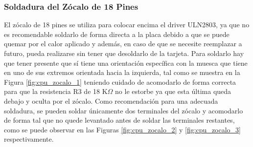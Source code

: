 \documentclass{article}
\begin{document}
\subsubsection{Soldadura del Zócalo de 18 Pines}
El zócalo de 18 pines se utiliza para colocar encima el driver ULN2803, ya que no es recomendable soldarlo de forma directa a la placa debido a que se puede quemar por el calor aplicado y además, en caso de que se necesite reemplazar a futuro, pueda realizarse sin tener que desoldarlo de la tarjeta. Para soldarlo hay que tener presente que sí tiene una orientación específica con la muesca que tiene en uno de sus extremos orientada hacia la izquierda, tal como se muestra en la Figura \ref{fig:cpu_zocalo_1} teniendo cuidado de acomodarlo de forma correcta para que la resistencia R3 de 18 K$\Omega$ no le estorbe ya que esta última queda debajo y oculta por el zócalo. Como recomendación para una adecuada soldadura, se pueden soldar únicamente dos terminales del zócalo y acomodarlo de forma tal que no quede levantado antes de soldar las terminales restantes, como se puede observar en las Figuras \ref{fig:cpu_zocalo_2} y  \ref{fig:cpu_zocalo_3} respectivamente.
\end{document}
